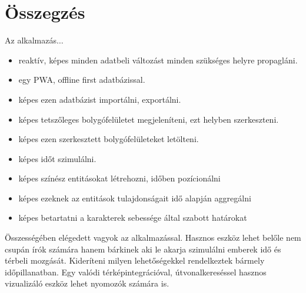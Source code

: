 \chapter{Összegzés}
\label{ch:sum}

Az alkalmazás$\dots$

\begin{itemize}
	\item reaktív, képes minden adatbeli változást minden szükséges helyre propagláni.
	\item egy PWA, offline first adatbázissal.
	\item képes ezen adatbázist importálni, exportálni.
	\item képes tetszőleges bolygófelületet megjeleníteni, ezt helyben szerkeszteni.
	\item képes ezen szerkesztett bolygófelületeket letölteni.
	\item képes időt szimulálni.
	\item képes színész entitásokat létrehozni, időben pozícionálni
	\item képes ezeknek az entitások tulajdonságait idő alapján aggregálni
	\item képes betartatni a karakterek sebessége által szabott határokat

\end{itemize}

Összességében elégedett vagyok az alkalmazással. Hasznos eszköz lehet belőle nem csupán írók számára hanem bárkinek aki le akarja szimulálni emberek idő és térbeli mozgását. Kideríteni milyen lehetőségekkel rendelkeztek bármely időpillanatban. Egy valódi térképintegrációval, útvonalkereséssel hasznos vizualizáló eszköz lehet nyomozók számára is.
